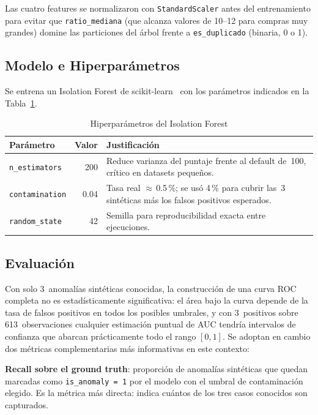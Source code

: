 \documentclass[conference]{IEEEtran}
\begin{document}
Las cuatro features se normalizaron con \texttt{StandardScaler} antes del
entrenamiento para evitar que \texttt{ratio\_mediana} (que alcanza valores de
10--12 para compras muy grandes) domine las particiones del \'arbol frente a
\texttt{es\_duplicado} (binaria, 0 o 1).

\subsection{Modelo e Hiperpar\'ametros}

Se entrena un Isolation Forest de scikit-learn~\cite{liu2008isolation} con los
par\'ametros indicados en la Tabla~\ref{tab:hyperparams}.

\begin{table}[h]
\caption{Hiperpar\'ametros del Isolation Forest}
\label{tab:hyperparams}
\centering
\begin{tabular}{lrp{3.8cm}}
\toprule
\textbf{Par\'ametro} & \textbf{Valor} & \textbf{Justificaci\'on} \\
\midrule
\texttt{n\_estimators} & 200 & Reduce varianza del puntaje frente al default de~100, cr\'itico en datasets peque\~nos. \\
\addlinespace
\texttt{contamination} & 0.04 & Tasa real $\approx$\,0.5\,\%; se us\'o 4\,\% para cubrir las~3 sint\'eticas m\'as los falsos positivos esperados. \\
\addlinespace
\texttt{random\_state}  & 42  & Semilla para reproducibilidad exacta entre ejecuciones. \\
\bottomrule
\end{tabular}
\end{table}

\subsection{Evaluaci\'on}

Con solo 3~anomal\'ias sint\'eticas conocidas, la construcci\'on de una curva ROC
completa no es estad\'isticamente significativa: el \'area bajo la curva depende de
la tasa de falsos positivos en todos los posibles umbrales, y con 3~positivos sobre
613~observaciones cualquier estimaci\'on puntual de AUC tendr\'ia intervalos de
confianza que abarcan pr\'acticamente todo el rango $[0,1]$. Se adoptan en cambio
dos m\'etricas complementarias m\'as informativas en este contexto:

\textbf{Recall sobre el ground truth}: proporci\'on de anomal\'ias sint\'eticas
que quedan marcadas como \texttt{is\_anomaly\,=\,1} por el modelo con el umbral
de contaminaci\'on elegido. Es la m\'etrica m\'as directa: indica cu\'antos de
los tres casos conocidos son capturados.
\end{document}
